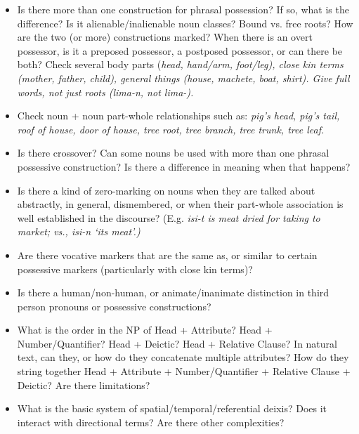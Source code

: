 \begin{itemize}
	\item	Is there more than one construction for phrasal possession?
				If so, what is the difference? Is it alienable/inalienable noun classes? Bound vs.
				free roots? How are the two (or more) constructions marked? When
				there is an overt possessor,
				is it a preposed possessor,
				a postposed possessor, or can there be both? Check several body
				parts (\it{head, hand/arm, foot/leg}), close kin terms (\it{mother,
				father, child}), general things (\it{house, machete, boat, shirt}).
				Give full words, not just roots (\it{lima-n,} not \it{lima-}).

	\item	Check noun + noun part-whole relationships such as: \it{pig’s
				head, pig’s tail, roof of house, door of house,
				tree root, tree branch,
				tree trunk, tree leaf.}

	\item	Is there crossover? Can some nouns be used with more than one
				phrasal possessive construction? Is there a difference in meaning
				when that happens?
				
	\item	Is there a kind of zero-marking on nouns when they are talked
				about abstractly, in general, dismembered, or when their part-whole association
				is well established in the discourse? (E.g.
				 \it{isi-t} is meat dried for taking to market; vs.,
				\it{isi-n} ‘its meat’.)
				
	\item	Are there vocative markers that are the same as,
				or similar to certain possessive markers (particularly with close
				kin terms)?
				
	\item	Is there a human/non-human,
				or animate/inanimate distinction in third person pronouns or
				possessive constructions?
				
	\item	What is the order in the NP of Head + Attribute? Head + Number/Quantifier?
				Head + Deictic? Head + Relative Clause? In natural text,
				can they, or how do they concatenate multiple attributes? How
				do they string together Head + Attribute + Number/Quantifier
				+ Relative Clause + Deictic? Are there limitations?

	\item	What is the basic system of spatial/temporal/referential deixis?
				Does it interact with directional terms? Are there other complexities?


\end{itemize}
